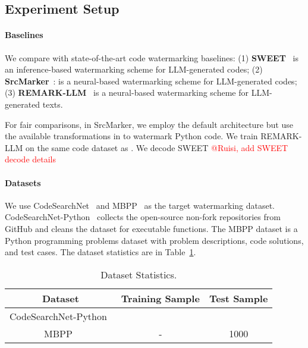 \subsection{Experiment Setup}

\paragraph{Baselines} We compare \sys{} with state-of-the-art code watermarking baselines: (1) \textbf{SWEET}~\cite{lee2023wrote} is an inference-based watermarking scheme for LLM-generated codes; (2) \textbf{SrcMarker}~\cite{yang2024srcmarker}: is a neural-based watermarking scheme for LLM-generated codes; (3) \textbf{REMARK-LLM}~\cite{zhang2024remark} is a neural-based watermarking scheme for LLM-generated texts. 

For fair comparisons, in SrcMarker, we employ the default architecture but use the available transformations in \sys{} to watermark Python code. 
We train REMARK-LLM on the same code dataset as \sys. 
We decode SWEET \textcolor{red}{@Ruisi, add SWEET decode details}


\paragraph{Datasets} We use CodeSearchNet~\cite{husain2019codesearchnet} and MBPP~\cite{austin2021program} as the target watermarking dataset. CodeSearchNet-Python~\cite{husain2019codesearchnet} collects the open-source non-fork repositories from GitHub and cleans the dataset for executable functions. The MBPP dataset is a Python programming problems dataset with problem descriptions, code solutions, and test cases. The dataset statistics are in Table~\ref{tab:dataset}.


\begin{table}[h]
\centering
\small
\begin{tabular}{ccc}
\toprule
Dataset & Training Sample  & Test Sample \\ \midrule
CodeSearchNet-Python~\cite{husain2019codesearchnet} &  &  \\ 
MBPP~\cite{austin2021program} & - & 1000 \\
\bottomrule
\end{tabular}
\caption{Dataset Statistics.\label{tab:dataset}}
\end{table}


